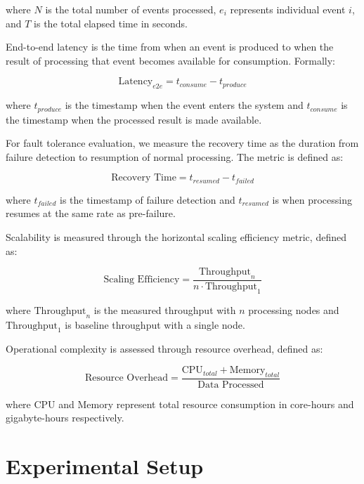 \documentclass[10pt,twocolumn]{article}
\begin{document}
where $N$ is the total number of events processed, $e_i$ represents individual event $i$, and $T$ is the total elapsed time in seconds.

End-to-end latency is the time from when an event is produced to when the result of processing that event becomes available for consumption. Formally:

\begin{equation}
\text{Latency}_{e2e} = t_{consume} - t_{produce}
\end{equation}

where $t_{produce}$ is the timestamp when the event enters the system and $t_{consume}$ is the timestamp when the processed result is made available.

For fault tolerance evaluation, we measure the recovery time as the duration from failure detection to resumption of normal processing. The metric is defined as:

\begin{equation}
\text{Recovery Time} = t_{resumed} - t_{failed}
\end{equation}

where $t_{failed}$ is the timestamp of failure detection and $t_{resumed}$ is when processing resumes at the same rate as pre-failure.

Scalability is measured through the horizontal scaling efficiency metric, defined as:

\begin{equation}
\text{Scaling Efficiency} = \frac{\text{Throughput}_{n}}{n \cdot \text{Throughput}_{1}}
\end{equation}

where $\text{Throughput}_{n}$ is the measured throughput with $n$ processing nodes and $\text{Throughput}_{1}$ is baseline throughput with a single node.

Operational complexity is assessed through resource overhead, defined as:

\begin{equation}
\text{Resource Overhead} = \frac{\text{CPU}_{total} + \text{Memory}_{total}}{\text{Data Processed}}
\end{equation}

where CPU and Memory represent total resource consumption in core-hours and gigabyte-hours respectively.

\section{Experimental Setup}
\end{document}
